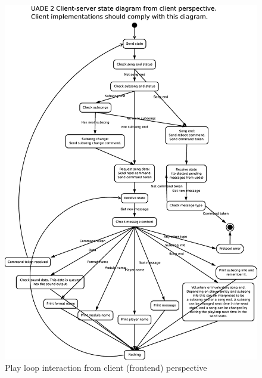 \documentclass{article}
\begin{document}
\begin{figure}
\centering
\includegraphics[scale=0.25]{play_loop_state_diagram.eps}
\caption{Play loop interaction from client (frontend) perspective}
\label{fig:playloop}
\end{figure}
\end{document}
